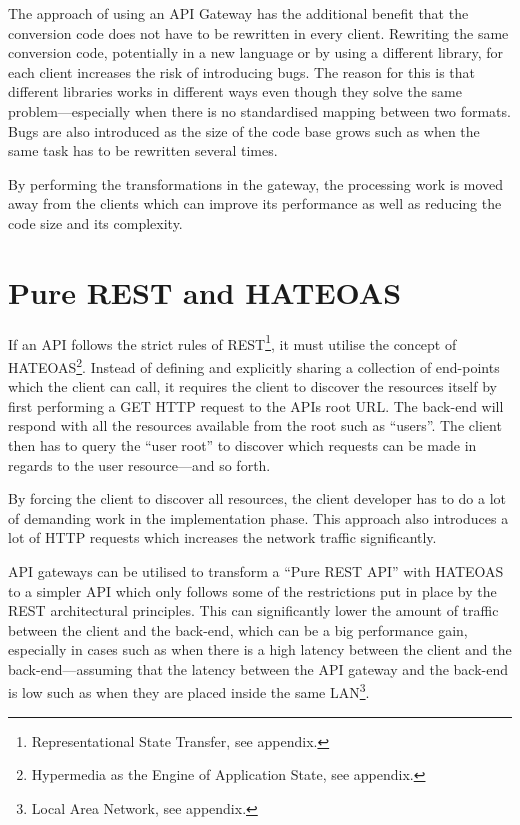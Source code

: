 \documentclass{cslthse-msc}
\begin{document}
The approach of using an API Gateway has the additional benefit that the conversion code does not have to be rewritten in every client. Rewriting the same conversion code, potentially in a new language or by using a different library, for each client increases the risk of introducing bugs. The reason for this is that different libraries works in different ways even though they solve the same problem---especially when there is no standardised mapping between two formats. Bugs are also introduced as the size of the code base grows such as when the same task has to be rewritten several times\cite[page 521]{code_complete}. 

By performing the transformations in the gateway, the processing work is moved away from the clients which can improve its performance as well as reducing the code size and its complexity.

\section{Pure REST and HATEOAS}
If an API follows the strict rules of REST\footnote{Representational State Transfer, see appendix.}, it must utilise the concept of HATEOAS\footnote{Hypermedia as the Engine of Application State, see appendix.}. Instead of defining and explicitly sharing a collection of end-points which the client can call, it requires the client to discover the resources itself by first performing a GET HTTP request to the APIs root URL. The back-end will respond with all the resources available from the root such as \enquote{users}. The client then has to query the \enquote{user root} to discover which requests can be made in regards to the user resource---and so forth. 

By forcing the client to discover all resources, the client developer has to do a lot of demanding work in the implementation phase\cite[page 62]{AASG}. This approach also introduces a lot of HTTP requests which increases the network traffic significantly.

API gateways can be utilised to transform a \enquote{Pure REST API} with HATEOAS to a simpler API which only follows some of the restrictions put in place by the REST architectural principles. This can significantly lower the amount of traffic between the client and the back-end, which can be a big performance gain, especially in cases such as when there is a high latency between the client and the back-end---assuming that the latency between the API gateway and the back-end is low such as when they are placed inside the same LAN\footnote{Local Area Network, see appendix.}.
\end{document}
